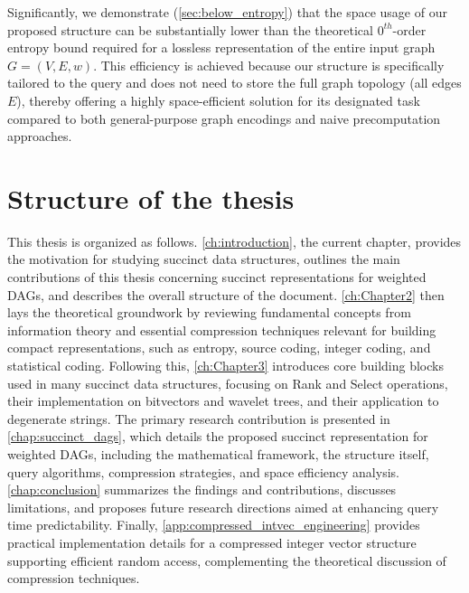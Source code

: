 Significantly, we demonstrate (\autoref{sec:below_entropy}) that the space usage of our proposed structure can be substantially lower than the theoretical $0^{th}$-order entropy bound required for a lossless representation of the entire input graph $G=(V, E, w)$. This efficiency is achieved because our structure is specifically tailored to the \Rank{} query and does not need to store the full graph topology (all edges $E$), thereby offering a highly space-efficient solution for its designated task compared to both general-purpose graph encodings and naive precomputation approaches.

\section{Structure of the thesis}
\label{sec:structure}

This thesis is organized as follows. \autoref{ch:introduction}, the current chapter, provides the motivation for studying succinct data structures, outlines the main contributions of this thesis concerning succinct representations for weighted DAGs, and describes the overall structure of the document. \autoref{ch:Chapter2} then lays the theoretical groundwork by reviewing fundamental concepts from information theory and essential compression techniques relevant for building compact representations, such as entropy, source coding, integer coding, and statistical coding. Following this, \autoref{ch:Chapter3} introduces core building blocks used in many succinct data structures, focusing on Rank and Select operations, their implementation on bitvectors and wavelet trees, and their application to degenerate strings. The primary research contribution is presented in \autoref{chap:succinct_dags}, which details the proposed succinct representation for weighted DAGs, including the mathematical framework, the structure itself, query algorithms, compression strategies, and space efficiency analysis. \autoref{chap:conclusion} summarizes the findings and contributions, discusses limitations, and proposes future research directions aimed at enhancing query time predictability. Finally, \autoref{app:compressed_intvec_engineering} provides practical implementation details for a compressed integer vector structure supporting efficient random access, complementing the theoretical discussion of compression techniques.
